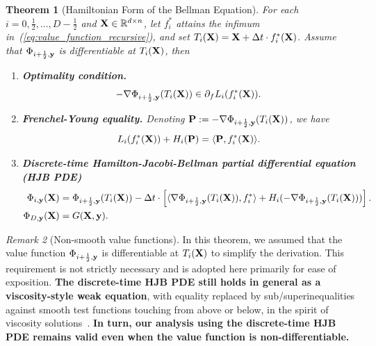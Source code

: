 \documentclass[journal]{IEEEtran}
\def\eqref#1{equation~\ref{#1}}
\newcommand{\bfP}{{\bf P}}
\newcommand{\bfX}{{\bf X}}
\newcommand{\bfy}{ {\bf y}}
\renewcommand{\eqref}[1]{(\ref{#1})}
\theoremstyle{plain}
\newtheorem{theorem}{Theorem}
\theoremstyle{definition}
\theoremstyle{remark}
\newtheorem{remark}[theorem]{Remark}
\begin{document}
\begin{theorem}[Hamiltonian Form of the Bellman Equation]
    For each $i=0,\frac{1}{2},...,D-\frac{1}{2}$ and $\bfX \in \mathbb{R}^{d \times n}$, let $f_i^*$ attains the infimum in~\eqref{eq:value_function_recursive}, and set $T_i(\bfX) = \bfX + \Delta t \cdot f_i^*(\bfX)$. Assume that $\Phi_{i+\frac{1}{2}, \bfy}$ is differentiable at $T_i(\bfX)$, then
    \begin{enumerate}
        \item \textbf{Optimality condition.}
        \begin{equation}\label{eq:velocity_optimal}
            - \nabla \Phi_{{i+\frac{1}{2}, \bfy}}(T_i(\bfX)) \in \partial_f L_i(f_i^*(\bfX)).
        \end{equation}
        \item \textbf{Frenchel-Young equality.} Denoting $\bfP := -\nabla \Phi_{i+\frac{1}{2}, \bfy}(T_i(\bfX))$, we have
        \begin{equation}\label{eq:Frenchel_Young}
            L_i(f_i^*(\bfX)) + H_i(\bfP) = \langle \bfP, f_i^*(\bfX) \rangle.
        \end{equation}
        \item \textbf{Discrete-time Hamilton-Jacobi-Bellman partial differential equation (HJB PDE)}
        \begin{align}\label{eq:HJB_generic_appendix}
\begin{split}
    \Phi_{i, \bfy}(\bfX) &= \Phi_{i+\frac{1}{2}, \bfy}(T_i(\bfX)) - \Delta t \cdot \left[ \langle \nabla \Phi_{i+\frac{1}{2}, \bfy}(T_i(\bfX)), f_i^* \rangle + H_i(-\nabla \Phi_{i+\frac{1}{2}, \bfy}(T_i(\bfX))) \right]. \\
    \Phi_{D,\bfy}(\bfX) &=G(\bfX, \bfy).
    \end{split}
\end{align}
    \end{enumerate}
\end{theorem}

    \begin{remark}[Non-smooth value functions]\label{rem:visc_nonsmooth}
In this theorem, we assumed that the value function $\Phi_{i+\frac{1}{2}, \bfy}$ is differentiable at $T_i(\bfX)$ to simplify the derivation. This requirement is not strictly necessary and is adopted here primarily for ease of exposition. \textbf{The discrete-time HJB PDE still holds in general as a viscosity-style weak equation}, with equality replaced by sub/superinequalities
against smooth test functions touching from
above or below, in the spirit of viscosity
solutions~\cite{barles1991convergence,falcone2014semilagrangian}. \textbf{In turn, our analysis using the discrete-time HJB PDE remains valid even when the value function is non-differentiable.}
\end{remark}
\end{document}
